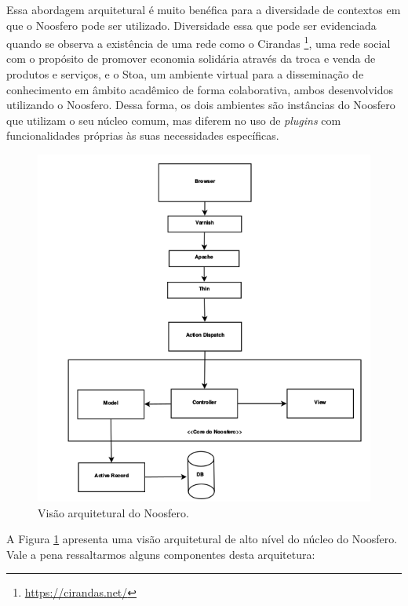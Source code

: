\documentclass[12pt]{article}
\begin{document}
Essa abordagem arquitetural é muito benéfica para a diversidade de contextos
em que o Noosfero pode ser utilizado. Diversidade essa que pode ser evidenciada
quando se observa a existência de uma rede como o Cirandas%
\footnote{\url{https://cirandas.net/}},
uma rede social com o propósito de promover economia solidária através
da troca e venda de produtos e serviços, e o
Stoa, um ambiente virtual para a disseminação de conhecimento em âmbito
acadêmico de forma colaborativa, ambos desenvolvidos utilizando o Noosfero.
%
Dessa forma, os dois ambientes são instâncias do Noosfero que utilizam o seu
núcleo comum, mas diferem no uso de \textit{plugins} com funcionalidades
próprias às suas necessidades específicas.

\begin{figure}[H]
    \centering
      \includegraphics[keepaspectratio=true,scale=0.4]{images/noosfero-architecture.png}
    \caption{Visão arquitetural do Noosfero.}
    \label{noosfero-arch}
\end{figure}

A Figura \ref{noosfero-arch} apresenta uma visão arquitetural de alto nível
do núcleo do Noosfero. Vale a pena ressaltarmos alguns componentes desta arquitetura:
\end{document}
